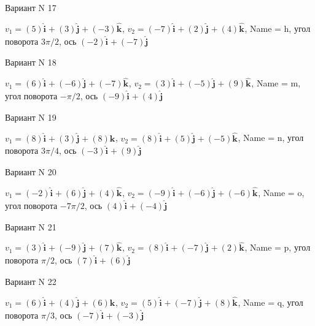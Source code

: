 \documentclass[11pt]{report}
\begin{document}
Вариант N 17

$v_1 = \left(5\right)\mathbf{\hat{i}_{}} + \left(3\right)\mathbf{\hat{j}_{}} + \left(-3\right)\mathbf{\hat{k}_{}}$, $v_2 = \left(-7\right)\mathbf{\hat{i}_{}} + \left(2\right)\mathbf{\hat{j}_{}} + \left(4\right)\mathbf{\hat{k}_{}}$, Name = h, угол поворота $3 \pi / 2$, ось $\left(-2\right)\mathbf{\hat{i}_{}} + \left(-7\right)\mathbf{\hat{j}_{}}$

Вариант N 18

$v_1 = \left(6\right)\mathbf{\hat{i}_{}} + \left(-6\right)\mathbf{\hat{j}_{}} + \left(-7\right)\mathbf{\hat{k}_{}}$, $v_2 = \left(3\right)\mathbf{\hat{i}_{}} + \left(-5\right)\mathbf{\hat{j}_{}} + \left(9\right)\mathbf{\hat{k}_{}}$, Name = m, угол поворота $- \pi / 2$, ось $\left(-9\right)\mathbf{\hat{i}_{}} + \left(4\right)\mathbf{\hat{j}_{}}$

Вариант N 19

$v_1 = \left(8\right)\mathbf{\hat{i}_{}} + \left(3\right)\mathbf{\hat{j}_{}} + \left(8\right)\mathbf{\hat{k}_{}}$, $v_2 = \left(8\right)\mathbf{\hat{i}_{}} + \left(5\right)\mathbf{\hat{j}_{}} + \left(-5\right)\mathbf{\hat{k}_{}}$, Name = n, угол поворота $3 \pi / 4$, ось $\left(-3\right)\mathbf{\hat{i}_{}} + \left(9\right)\mathbf{\hat{j}_{}}$

Вариант N 20

$v_1 = \left(-2\right)\mathbf{\hat{i}_{}} + \left(6\right)\mathbf{\hat{j}_{}} + \left(4\right)\mathbf{\hat{k}_{}}$, $v_2 = \left(-9\right)\mathbf{\hat{i}_{}} + \left(-6\right)\mathbf{\hat{j}_{}} + \left(-6\right)\mathbf{\hat{k}_{}}$, Name = o, угол поворота $- 7 \pi / 2$, ось $\left(4\right)\mathbf{\hat{i}_{}} + \left(-4\right)\mathbf{\hat{j}_{}}$

Вариант N 21

$v_1 = \left(3\right)\mathbf{\hat{i}_{}} + \left(-9\right)\mathbf{\hat{j}_{}} + \left(7\right)\mathbf{\hat{k}_{}}$, $v_2 = \left(8\right)\mathbf{\hat{i}_{}} + \left(-7\right)\mathbf{\hat{j}_{}} + \left(2\right)\mathbf{\hat{k}_{}}$, Name = p, угол поворота $\pi / 2$, ось $\left(7\right)\mathbf{\hat{i}_{}} + \left(6\right)\mathbf{\hat{j}_{}}$

Вариант N 22

$v_1 = \left(6\right)\mathbf{\hat{i}_{}} + \left(4\right)\mathbf{\hat{j}_{}} + \left(6\right)\mathbf{\hat{k}_{}}$, $v_2 = \left(5\right)\mathbf{\hat{i}_{}} + \left(-7\right)\mathbf{\hat{j}_{}} + \left(8\right)\mathbf{\hat{k}_{}}$, Name = q, угол поворота $\pi / 3$, ось $\left(-7\right)\mathbf{\hat{i}_{}} + \left(-3\right)\mathbf{\hat{j}_{}}$
\end{document}
